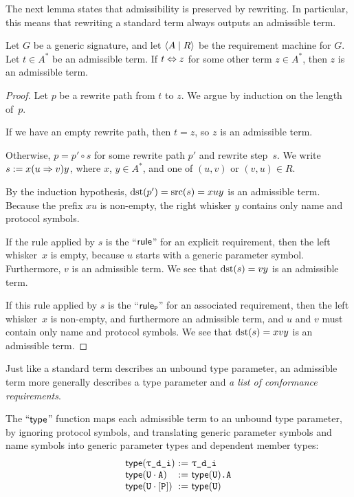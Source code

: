 \documentclass[../generics]{subfiles}
\begin{document}
The next lemma states that admissibility is preserved by rewriting. In particular, this means that rewriting a standard term always outputs an admissible term.
\begin{lemma}\label{rewriting admissible term}
Let $G$ be a generic signature, and let $\langle A \mid R\rangle$ be the requirement machine for $G$. Let $t\in A^*$ be an admissible term. If $t\Leftrightarrow z$ for some other term $z\in A^*$, then $z$ is an admissible term.
\end{lemma}
\begin{proof}
Let $p$ be a rewrite path from $t$ to $z$. We argue by induction on the length of~$p$.

\BaseCase If we have an empty rewrite path, then $t=z$, so $z$ is an admissible term.

\InductiveStep Otherwise, $p=p' \circ s$ for some rewrite path $p'$ and rewrite step~$s$. We write $s := x(u\Rightarrow v)y$, where $x$, $y\in A^*$, and one of $(u,v)$ or $(v,u)\in R$.

By the induction hypothesis, $\operatorname{dst}(p')=\operatorname{src}(s)=xuy$ is an admissible term. Because the prefix $xu$ is non-empty, the right whisker $y$ contains only name and protocol symbols.

If the rule applied by $s$ is the ``$\mathsf{rule}$'' for an explicit requirement, then the left whisker~$x$ is empty, because $u$ starts with a generic parameter symbol. Furthermore, $v$ is an admissible term. We see that $\operatorname{dst}(s)=vy$ is an admissible term.

If this rule applied by $s$ is the ``$\mathsf{rule}_{\texttt{P}}$'' for an associated requirement, then the left whisker~$x$ is non-empty, and furthermore an admissible term, and $u$ and $v$ must contain only name and protocol symbols. We see that $\operatorname{dst}(s)=xvy$ is an admissible term.
\end{proof}

\newcommand{\Chart}{\mathsf{chart}}

Just like a standard term describes an unbound type parameter, an admissible term more generally describes a type parameter and \textsl{a list of conformance requirements}.

\begin{definition}
The ``$\mathsf{type}$'' function maps each admissible term to an unbound type parameter, by ignoring protocol symbols, and translating generic parameter symbols and name symbols into generic parameter types and dependent member types:
\[
\begin{array}{l@{\ :=\ }l}
\Type(\ttgp{d}{i})&\ttgp{d}{i} \\
\Type(\tU \cdot \nA)&\Type(\tU)\texttt{.A} \\
\Type(\tU \cdot \pP)&\Type(\tU)
\end{array}
\]
\end{definition}
\end{document}
